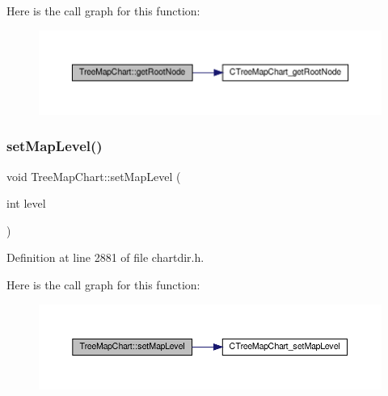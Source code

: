 Here is the call graph for this function\+:
\nopagebreak
\begin{figure}[H]
\begin{center}
\leavevmode
\includegraphics[width=350pt]{class_tree_map_chart_a75161aecc888f38bd2f12ac69f380a4a_cgraph}
\end{center}
\end{figure}
\mbox{\label{class_tree_map_chart_a5ab2226f46d6f24865768260ae19f51d}} 
\subsubsection{\texorpdfstring{set\+Map\+Level()}{setMapLevel()}}
{\footnotesize\ttfamily void Tree\+Map\+Chart\+::set\+Map\+Level (\begin{DoxyParamCaption}\item[{int}]{level }\end{DoxyParamCaption})\hspace{0.3cm}{\ttfamily [inline]}}



Definition at line 2881 of file chartdir.\+h.

Here is the call graph for this function\+:
\nopagebreak
\begin{figure}[H]
\begin{center}
\leavevmode
\includegraphics[width=350pt]{class_tree_map_chart_a5ab2226f46d6f24865768260ae19f51d_cgraph}
\end{center}
\end{figure}
\mbox{\label{class_tree_map_chart_a23395c32c80a297aacbf1d17b3ff5932}} 
